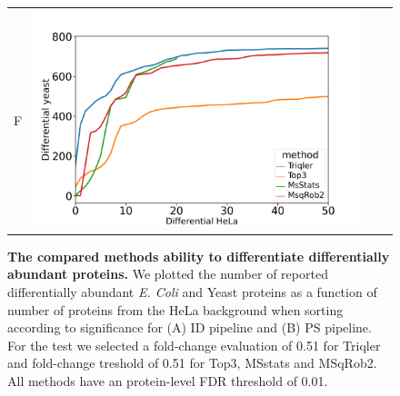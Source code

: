 \documentclass[11pt]{article}
\begin{document}
\begin{figure}[hbt]
\begin{tabular}{lclc}
        F & \includegraphics[width=0.45\linewidth]{../../result/report_plots_pipeline/diff_HeLa_vs_nonHeLa_PS_yeast_0.51.png} \\ 

    \end{tabular}
    \caption{{\bf The compared methods ability to differentiate differentially abundant proteins.} We plotted the number of reported differentially abundant  {\em E. Coli} and Yeast proteins as a function of number of proteins from the HeLa background when sorting according to significance for (A) ID pipeline and (B) PS pipeline. For the test we selected a fold-change evaluation of 0.51 for Triqler and fold-change treshold of 0.51 for Top3, MSstats and MSqRob2. All methods have an protein-level FDR threshold of 0.01. \label{fig:ability_to_differentiate_differentially_abundant_specie_vs_hela}}
\end{figure}
\end{document}
